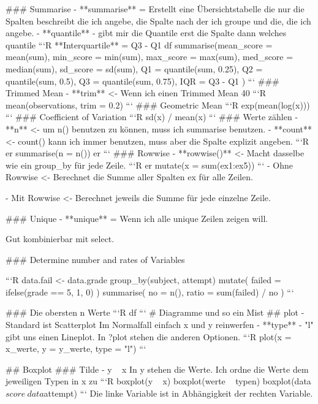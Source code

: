 \begin{markdown}
### Summarise
- **summarise** = Erstellt eine Übersichtstabelle die nur die Spalten beschreibt die ich angebe, die Spalte nach der ich groupe und die, die ich angebe.
- **quantile** - gibt mir die Quantile erst die Spalte dann welches quantile
```R
**Interquartile** = Q3 - Q1
df %
  summarise(mean_score = mean(sum),
            min_score = min(sum),
            max_score = max(sum),
            med_score = median(sum),
            sd_score = sd(sum),
            Q1 = quantile(sum, 0.25),
            Q2 = quantile(sum, 0.5),
            Q3 = quantile(sum, 0.75),
            IQR = Q3 - Q1
            )
```
### Trimmed Mean
- **trim** <- Wenn ich einen Trimmed Mean 40%
```R
mean(observations, trim = 0.2)
```
### Geometric Mean
```R
exp(mean(log(x)))
```
### Coefficient of Variation
```R
sd(x) / mean(x)
```
### Werte zählen
- **n** <- um n() benutzen zu können, muss ich summarise benutzen.
- **count** <-  count() kann ich immer benutzen, muss aber die Spalte explizit angeben.
```R
er %
  summarise(n = n())
er %
```
### Rowwise
- **rowwise()** <- Macht dasselbe wie ein group_by für jede Zeile.
```R
er %
  mutate(x = sum(ex1:ex5))
```
- Ohne Rowwise <- Berechnet die Summe aller Spalten ex für alle Zeilen.

- Mit Rowwise <- Berechnet jeweils die Summe für jede einzelne Zeile.

### Unique
- **unique** = Wenn ich alle unique Zeilen zeigen will. 

Gut kombinierbar mit select.

### Determine number and rates of Variables

```R
data.fail <- data.grade %
    group_by(subject, attempt) %
    mutate(
        failed = ifelse(grade == 5, 1, 0)
    ) %
    summarise(
        no = n(),
        ratio = sum(failed) / no
    )
```

### Die obersten n Werte
```R
df %
```
# Diagramme und so ein Mist
## plot - Standard ist Scatterplot
Im Normalfall einfach x und y reinwerfen
- **type** - "l" gibt uns einen Lineplot. In ?plot stehen die anderen Optionen.
```R
plot(x = x_werte, y = y_werte, type = "l")
```

## Boxplot
### Tilde - y ~ x
In y stehen die Werte.
Ich ordne die Werte dem jeweiligen Typen in x zu
```R
boxplot(y ~ x)
boxplot(werte ~ typen)
boxplot(data$score ~ data$attempt)
```
Die linke Variable ist in Abhängigkeit der rechten Variable.


\end{markdown}
